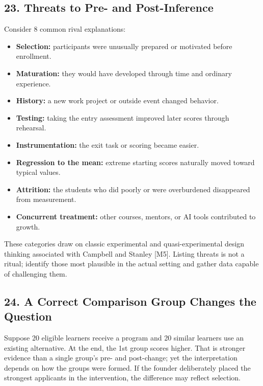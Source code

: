 \subsection*{23. Threats to Pre- and Post-Inference}

Consider 8 common rival explanations:

\begin{itemize}[leftmargin=1.5em, itemsep=0.4em]
    \item \textbf{Selection:} participants were unusually prepared or motivated before enrollment.
    \item \textbf{Maturation:} they would have developed through time and ordinary experience.
    \item \textbf{History:} a new work project or outside event changed behavior.
    \item \textbf{Testing:} taking the entry assessment improved later scores through rehearsal.
    \item \textbf{Instrumentation:} the exit task or scoring became easier.
    \item \textbf{Regression to the mean:} extreme starting scores naturally moved toward typical values.
    \item \textbf{Attrition:} the students who did poorly or were overburdened disappeared from measurement.
    \item \textbf{Concurrent treatment:} other courses, mentors, or AI tools contributed to growth.
\end{itemize}

These categories draw on classic experimental and quasi-experimental design thinking associated with Campbell and Stanley [M5]. Listing threats is not a ritual; identify those most plausible in the actual setting and gather data capable of challenging them.

\subsection*{24. A Correct Comparison Group Changes the Question}

Suppose 20 eligible learners receive a program and 20 similar learners use an existing alternative. At the end, the 1st group scores higher. That is stronger evidence than a single group's pre- and post-change; yet the interpretation depends on how the groups were formed. If the founder deliberately placed the strongest applicants in the intervention, the difference may reflect selection.

